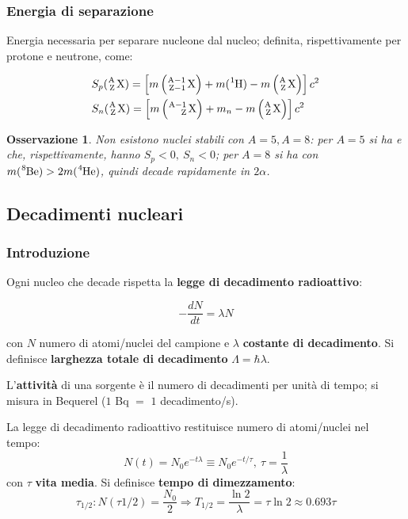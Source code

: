 \documentclass[10pt, a4paper]{scrartcl}
\numberwithin{equation}{subsection}
\theoremstyle{style1}
\newtheorem{osservazione}{Osservazione}[section]
\newenvironment{boxenv}[1][]{
    \begin{eqbox}[#1]
    }{
   \end{eqbox}
}
\begin{document}
\subsubsection{Energia di separazione}
Energia necessaria per separare nucleone dal nucleo; definita, rispettivamente per protone e neutrone, come:
\begin{boxenv}[]
\begin{equation}
	\begin{split}
		&S_p (\ce{^A_Z X}) = \left[ m\left(\ce{^{A-1}_{Z-1}  X}\right) + m(\ce{^1H}) - m\left(\ce{^A_Z X}\right)  \right] c^2\\
		&S_n (\ce{^A_Z X}) = \left[ m\left(\ce{^{A-1}_{Z}  X}\right) + m_n- m\left(\ce{^A_Z X}\right)  \right] c^2
	\end{split}
\end{equation}
\end{boxenv}

\begin{osservazione}
	Non esistono nuclei stabili con $A=5, A=8$: per $A=5$ si ha  e  che, rispettivamente, hanno $S_p<0, \ S_n<0$; per $A=8$ si ha  con $m(\ce{^8Be}) > 2m(\ce{^4He})$, quindi decade rapidamente in $2\alpha $.
\end{osservazione}
\subsection{Decadimenti nucleari}
\subsubsection{Introduzione}
Ogni nucleo che decade rispetta la \textbf{legge di decadimento radioattivo}:
\begin{boxenv}[]
\begin{equation}
	-\frac{d N}{d t} = \lambda N
\end{equation}
\end{boxenv}
\noindent con $N$ numero di atomi/nuclei del campione e $\lambda $ \textbf{costante di decadimento}. Si definisce \textbf{larghezza totale di decadimento} $\Lambda = \hbar \lambda $. 

L'\textbf{attivit\`a} di una sorgente \`e il numero di decadimenti per unit\`a di tempo; si misura in Bequerel ($1$ Bq $=$ $1$ decadimento/s).

La legge di decadimento radioattivo restituisce numero di atomi/nuclei nel tempo:
\begin{equation}
	N(t) = N_0 e^{-t \lambda } \equiv N_0 e^{- t / \tau } , \ \tau = \frac{1}{\lambda }
\end{equation}
con $\tau $ \textbf{vita media}. Si definisce \textbf{tempo di dimezzamento}:
\begin{equation}
	\tau _{1 / 2} : N(\tau  1 / 2) = \frac{N_0}{2} \Rightarrow T_{1 / 2}  = \frac{\ln 2}{\lambda } = \tau  \ln 2 \approx 0.693 \tau 
\end{equation}
\end{document}
